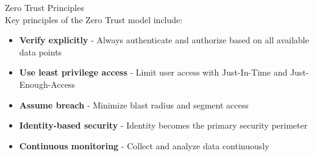 \begin{concept}{Zero Trust Principles}\\
Key principles of the Zero Trust model include:
\begin{itemize}
    \item \textbf{Verify explicitly} - Always authenticate and authorize based on all available data points
    \item \textbf{Use least privilege access} - Limit user access with Just-In-Time and Just-Enough-Access
    \item \textbf{Assume breach} - Minimize blast radius and segment access
    \item \textbf{Identity-based security} - Identity becomes the primary security perimeter
    \item \textbf{Continuous monitoring} - Collect and analyze data continuously
\end{itemize}
\end{concept}



